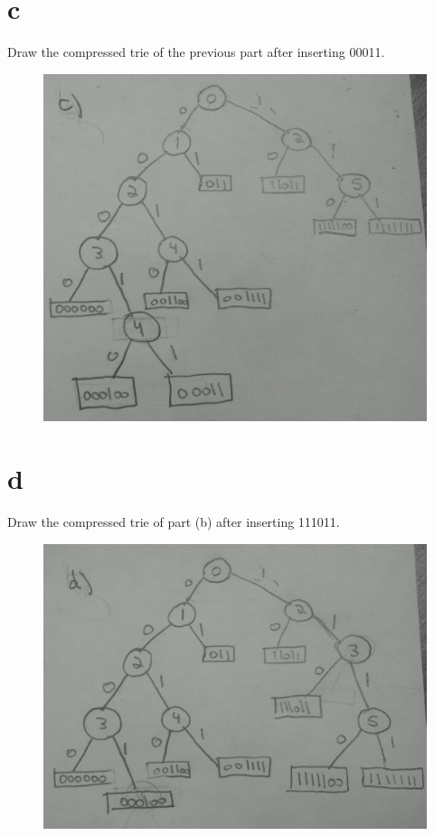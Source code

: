 \documentclass[12pt]{article}
\begin{document}
\begin{itemize}
\part{c} Draw the compressed trie of the previous part after inserting 00011.
\begin{figure}[ht!]
\centering
\includegraphics[width=170mm]{6c.jpg}
\label{overflow}
\end{figure}
\newpage
\part{d} Draw the compressed trie of part (b) after inserting 111011.
\begin{figure}[ht!]
\centering
\includegraphics[width=170mm]{6d.jpg}
\label{overflow}
\end{figure}
\newpage

\end{itemize}
\end{document}
